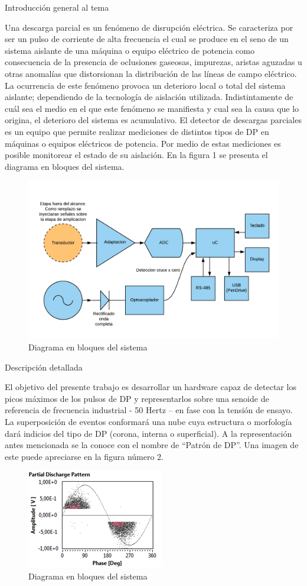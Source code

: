 \documentclass[11pt]{charter}
\begin{document}
Introducción general al tema

Una descarga parcial es un fenómeno de disrupción eléctrica. Se caracteriza por ser un
pulso de corriente de alta frecuencia el cual se produce en el seno de un sistema aislante de
una máquina o equipo eléctrico de potencia como consecuencia de la presencia de
oclusiones gaseosas, impurezas, aristas aguzadas u otras anomalías que distorsionan la
distribución de las líneas de campo eléctrico.
La ocurrencia de este fenómeno provoca un deterioro local o total del sistema aislante;
dependiendo de la tecnología de aislación utilizada. Indistintamente de cuál sea el medio en
el que este fenómeno se manifiesta y cual sea la causa que lo origina, el deterioro del
sistema es acumulativo.
El detector de descargas parciales es un equipo que permite realizar mediciones de
distintos tipos de DP en máquinas o equipos eléctricos de potencia. Por medio de estas
mediciones es posible monitorear el estado de su aislación.
En la figura 1 se presenta el diagrama en bloques del sistema.

\begin{figure}[htpb]
\centering 
\includegraphics[width=.7\textwidth]{./Figuras/diagBloques1.png}
\caption{Diagrama en bloques del sistema}
\label{fig:diagBloques}
\end{figure}

Descripción detallada

El objetivo del presente trabajo es desarrollar un hardware capaz de detectar los picos
máximos de los pulsos de DP y representarlos sobre una senoide de referencia de
frecuencia industrial - 50 Hertz – en fase con la tensión de ensayo. La superposición de
eventos conformará una nube cuya estructura o morfología dará indicios del tipo de DP
(corona, interna o superficial).
A la representación antes mencionada se la conoce con el nombre de “Patrón de DP”. Una
imagen de este puede apreciarse en la figura número 2.

\begin{figure}[htpb]
\centering 
\includegraphics[width=.3\textwidth]{./Figuras/patronDP.png}
\caption{Diagrama en bloques del sistema}
\label{fig:diagBloques}
\end{figure}
\end{document}
